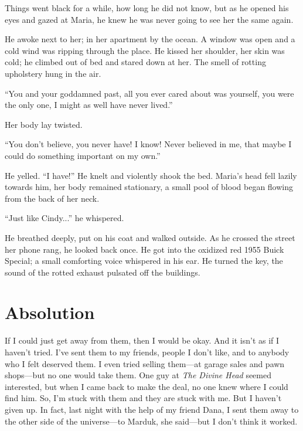 Things went black for a while, how long he did not know, but as he
opened his eyes and gazed at Maria, he knew he was never going to see
her the same again.

He awoke next to her; in her apartment by the ocean. A window was open
and a cold wind was ripping through the place. He kissed her shoulder,
her skin was cold; he climbed out of bed and stared down at her. The
smell of rotting upholstery hung in the air.

``You and your goddamned past, all you ever cared about was yourself,
you were the only one, I might as well have never lived.''

Her body lay twisted.

``You don't believe, you never have! I know! Never believed in me, that
maybe I could do something important on my own.''

He yelled. ``I have!'' He knelt and violently shook the bed. Maria's
head fell lazily towards him, her body remained stationary, a small pool
of blood began flowing from the back of her neck.

``Just like Cindy...'' he whispered.

He breathed deeply, put on his coat and walked outside. As he crossed
the street her phone rang, he looked back once. He got into the oxidized
red 1955 Buick Special; a small comforting voice whispered in his ear.
He turned the key, the sound of the rotted exhaust pulsated off the
buildings.

\chapter{Absolution}\label{absolution}

If I could just get away from them, then I would be okay. And it isn't
as if I haven't tried. I've sent them to my friends, people I don't
like, and to anybody who I felt deserved them. I even tried selling
them---at garage sales and pawn shops---but no one would take them. One
guy at \emph{The Divine Head} seemed interested, but when I came back to
make the deal, no one knew where I could find him. So, I'm stuck with
them and they are stuck with me. But I haven't given up. In fact, last
night with the help of my friend Dana, I sent them away to the other
side of the universe---to Marduk, she said---but I don't think it
worked.

